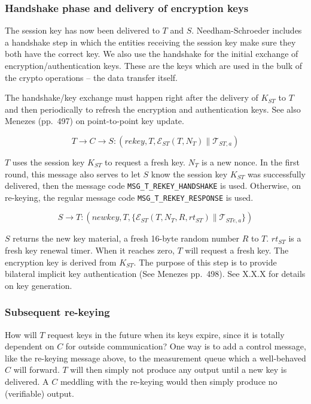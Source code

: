 \subsubsection{Handshake phase and delivery of encryption keys}

The session key has now been delivered to $T$ and
$S$. Needham-Schroeder includes a handshake step in which the entities
receiving the session key make sure they both have the correct key. We
also use the handshake for the initial exchange of
encryption/authentication keys. These are the keys which are used in
the bulk of the crypto operations -- the data transfer itself.

The handshake/key exchange must happen right after the delivery of
$K_{ST}$ to $T$ and then periodically to refresh the encryption and
authentication keys. See also Menezes (pp.\ 497) on point-to-point key
update.

\[
T \rightarrow C \rightarrow S: (rekey,T,\mathcal{E}_{ST}(T,N_T) \parallel \mathcal{T}_{ST,a})
\]

$T$ uses the session key $K_{ST}$ to request a fresh key. $N_T$ is a
new nonce. In the first round, this message also serves to let $S$
know the session key $K_{ST}$ was successfully delivered, then the
message code \texttt{MSG\_T\_REKEY\_HANDSHAKE} is used. Otherwise, on
re-keying, the regular message code \texttt{MSG\_T\_REKEY\_RESPONSE} is
used.

\[
S \rightarrow T: (newkey,T, \{ \mathcal{E}_{ST}(T,N_T,R,rt_{ST}) \parallel \mathcal{T}_{STe,a} \} )
\]

$S$ returns the new key material, a fresh 16-byte random number $R$ to $T$.
$rt_{ST}$ is a fresh key renewal timer. When it reaches zero, $T$ will request a fresh key. The encryption key is derived from $K_{ST}$. The purpose of this step is to provide bilateral implicit key authentication (See Menezes pp.\ 498). See X.X.X for details on key generation. 

\subsubsection{Subsequent re-keying}

How will $T$ request keys in the future when its keys expire, since it
is totally dependent on $C$ for outside communication? One way is to
add a control message, like the re-keying message above, to the
measurement queue which a well-behaved $C$ will forward. $T$ will then
simply not produce any output until a new key is delivered. A $C$
meddling with the re-keying would then simply produce no (verifiable)
output.

